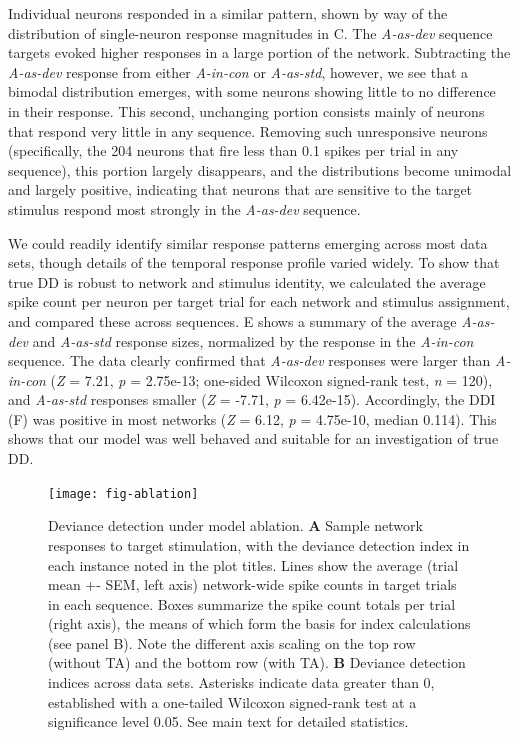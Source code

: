 \documentclass[9pt,lineno,onehalfspacing]{elife}
\newcommand{\dev}{\textit{A-as-dev}}
\newcommand{\msc}{\textit{A-in-con}}
\newcommand{\std}{\textit{A-as-std}}
\begin{document}
Individual neurons responded in a similar pattern, shown by way of the distribution of single-neuron response magnitudes in C. The \dev{} sequence targets evoked higher responses in a large portion of the network. Subtracting the \dev{} response from either \msc{} or \std{}, however, we see that a bimodal distribution emerges, with some neurons showing little to no difference in their response. This second, unchanging portion consists mainly of neurons that respond very little in any sequence. Removing such unresponsive neurons (specifically, the 204 neurons that fire less than 0.1 spikes per trial in any sequence), this portion largely disappears, and the distributions become unimodal and largely positive, indicating that neurons that are sensitive to the target stimulus respond most strongly in the \dev{} sequence.

We could readily identify similar response patterns emerging across most data sets, though details of the temporal response profile varied widely. To show that true DD is robust to network and stimulus identity, we calculated the average spike count per neuron per target trial for each network and stimulus assignment, and compared these across sequences. E shows a summary of the average \dev{} and \std{} response sizes, normalized by the response in the \msc{} sequence. The data clearly confirmed that \dev{} responses were larger than \msc{} (\textit{Z} = 7.21, \textit{p} = 2.75e-13; one-sided Wilcoxon signed-rank test, \textit{n} = 120), and \std{} responses smaller (\textit{Z} = -7.71, \textit{p} = 6.42e-15). Accordingly, the DDI (F) was positive in most networks (\textit{Z} = 6.12, \textit{p} = 4.75e-10, median 0.114). This shows that our model was well behaved and suitable for an investigation of true DD.

\begin{figure}
    \texttt{[image: fig-ablation]}
    \caption{%
        Deviance detection under model ablation.
        \textbf{A} Sample network responses to target stimulation, with the deviance detection index in each instance noted in the plot titles. Lines show the average (trial mean +- SEM, left axis) network-wide spike counts in target trials in each sequence. Boxes summarize the spike count totals per trial (right axis), the means of which form the basis for index calculations (see panel B). Note the different axis scaling on the top row (without TA) and the bottom row (with TA).
        \textbf{B} Deviance detection indices across data sets. Asterisks indicate data greater than 0, established with a one-tailed Wilcoxon signed-rank test at a significance level 0.05. See main text for detailed statistics.
    }
    \label{fig:ablation}
\end{figure}
\end{document}
